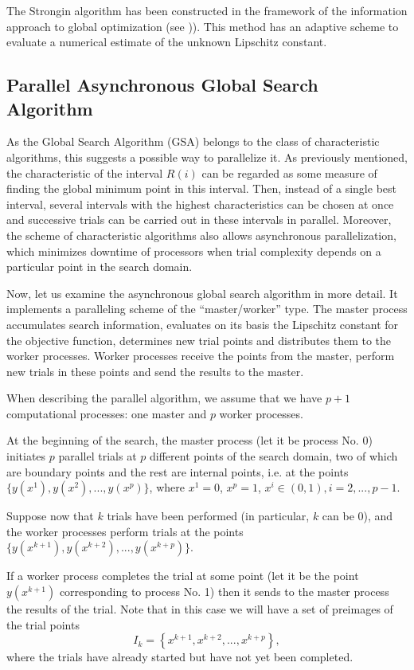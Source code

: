\documentclass{svproc}
\begin{document}
The Strongin algorithm has been constructed in the framework of the information approach to global optimization (see \cite{Strongin1978})). This method has an adaptive scheme to evaluate a numerical estimate of the unknown Lipschitz constant.


\subsection{Parallel Asynchronous Global Search Algorithm}

As the Global Search Algorithm (GSA) belongs to the class of characteristic algorithms, this suggests a possible way to parallelize it. 
As previously mentioned, the characteristic of the interval $R(i)$ can be regarded as some measure of finding the global minimum point in this interval. Then, instead of a single best interval, several intervals with the highest characteristics can be chosen at once and successive trials can be carried out in these intervals in parallel. Moreover, the scheme of characteristic algorithms also allows asynchronous parallelization, which minimizes downtime of processors when trial complexity depends on a particular point in the search domain. 

Now, let us examine the asynchronous global search algorithm in more detail. It implements a paralleling scheme of the ``master/worker'' type. The master process accumulates search information, evaluates on its basis the Lipschitz constant for the objective function, determines new trial points and distributes them to the worker processes. Worker processes receive the points from the master, perform new trials in these points and send the results to the master.

When describing the parallel algorithm, we assume that we have $p+1$ computational processes: one master and $p$ worker processes.
 
At the beginning of the search, the master process (let it be process No. 0) initiates $p$ parallel  trials at $p$ different points of the search domain, two of which are boundary points and the rest are internal points, i.e. at the points $\{y(x^1), y(x^2), ...,y(x^p)\}$, where $x^1 = 0$, $x^p = 1$, $x^i\in(0,1), i=2,..., p-1$.

Suppose now that $k$ trials have been performed (in particular, $k$ can be 0), and the worker processes perform trials at the points $\{y(x^{k+1}), y(x^{k+2}), ...,y(x^{k+p})\}$. 

If a worker process completes the trial at some point (let it be the point $y(x^{k+1})$ corresponding to process No. 1) then it sends to the master process the results of the trial. Note that in this case we will have a set of preimages of the trial points
\[
I_k = \left\{ x^{k+1},x^{k+2},...,x^{k+p} \right\},
\]
where the trials have already started but have not yet been completed.
\end{document}
